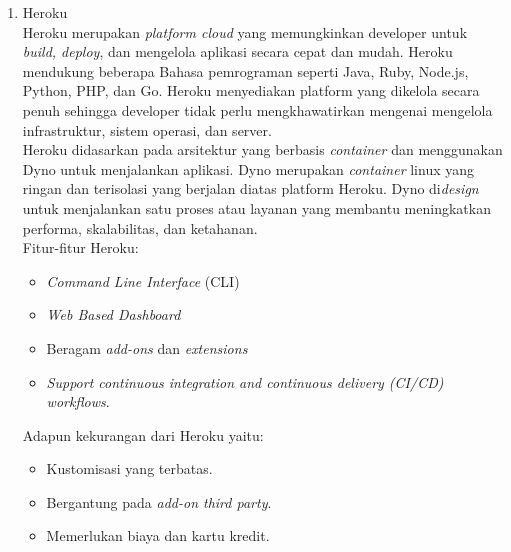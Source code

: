 \begin{enumerate}
	\item Heroku
	\\Heroku merupakan \textit{platform cloud} yang memungkinkan developer untuk \textit{build, deploy}, dan mengelola aplikasi secara cepat dan mudah. Heroku mendukung beberapa Bahasa pemrograman seperti Java, Ruby, Node.js, Python, PHP, dan Go. Heroku menyediakan platform yang dikelola secara penuh sehingga developer tidak perlu mengkhawatirkan mengenai mengelola infrastruktur, sistem operasi, dan server.
	\\Heroku didasarkan pada arsitektur yang berbasis \textit{container} dan menggunakan Dyno untuk menjalankan aplikasi. Dyno merupakan \textit{container} linux yang ringan dan terisolasi yang berjalan diatas platform Heroku. Dyno di\textit{design} untuk menjalankan satu proses atau layanan yang membantu meningkatkan performa, skalabilitas, dan ketahanan.
	\\Fitur-fitur Heroku:
	\begin{itemize}
		\item \textit{Command Line Interface }(CLI)
		\item \textit{Web Based Dashboard}
		\item Beragam \textit{add-ons} dan \textit{extensions}
		\item\textit{ Support continuous integration and continuous delivery (CI/CD) workflows}.
	\end{itemize}
	Adapun kekurangan dari Heroku yaitu:
	\begin{itemize}
		\item Kustomisasi yang terbatas.
		\item Bergantung pada \textit{add-on third party}.
		\item Memerlukan biaya dan kartu kredit.
	\end{itemize}
\end{enumerate}
